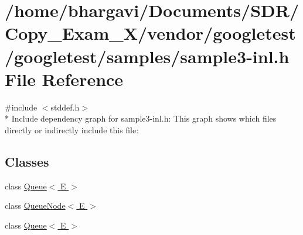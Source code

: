 \hypertarget{sample3-inl_8h}{}\section{/home/bhargavi/\+Documents/\+S\+D\+R/\+Copy\+\_\+\+Exam\+\_\+X/vendor/googletest/googletest/samples/sample3-\/inl.h File Reference}
\label{sample3-inl_8h}
{\ttfamily \#include $<$stddef.\+h$>$}\\*
Include dependency graph for sample3-\/inl.h\+:
This graph shows which files directly or indirectly include this file\+:
\subsection*{Classes}
\begin{DoxyCompactItemize}
\item 
class \hyperlink{class_queue}{Queue$<$ E $>$}
\item 
class \hyperlink{class_queue_node}{Queue\+Node$<$ E $>$}
\item 
class \hyperlink{class_queue}{Queue$<$ E $>$}
\end{DoxyCompactItemize}
